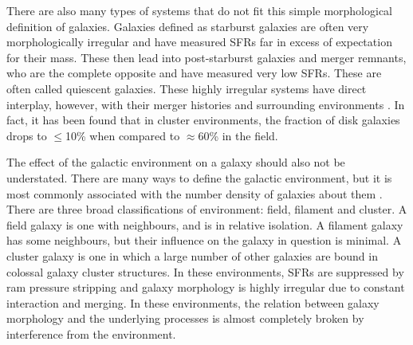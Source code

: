 There are also many types of systems that do not fit this simple morphological definition of galaxies. Galaxies defined as starburst galaxies are often very morphologically irregular and have measured SFRs far in excess of expectation for their mass. These then lead into post-starburst galaxies and merger remnants, who are the complete opposite and have measured very low SFRs. These are often called quiescent galaxies. These highly irregular systems have direct interplay, however, with their merger histories and surrounding environments \citep{2018MNRAS.477.1708P, 2020MNRAS.493.3716H}. In fact, it has been found that in cluster environments, the fraction of disk galaxies drops to $\leq$10\% when compared to $\approx$60\% in the field.

The effect of the galactic environment on a galaxy should also not be understated. There are many ways to define the galactic environment, but it is most commonly associated with the number density of galaxies about them \citep{2003ApJ...585..694E, 2004ApJ...615L.101B}. There are three broad classifications of environment: field, filament and cluster. A field galaxy is one with neighbours, and is in relative isolation. A filament galaxy has some neighbours, but their influence on the galaxy in question is minimal. A cluster galaxy is one in which a large number of other galaxies are bound in colossal galaxy cluster structures. In these environments, SFRs are suppressed \citep{2006MNRAS.373..469B} by ram pressure stripping and galaxy morphology is highly irregular due to constant interaction and merging. In these environments, the relation between galaxy morphology and the underlying processes is almost completely broken by interference from the environment.

